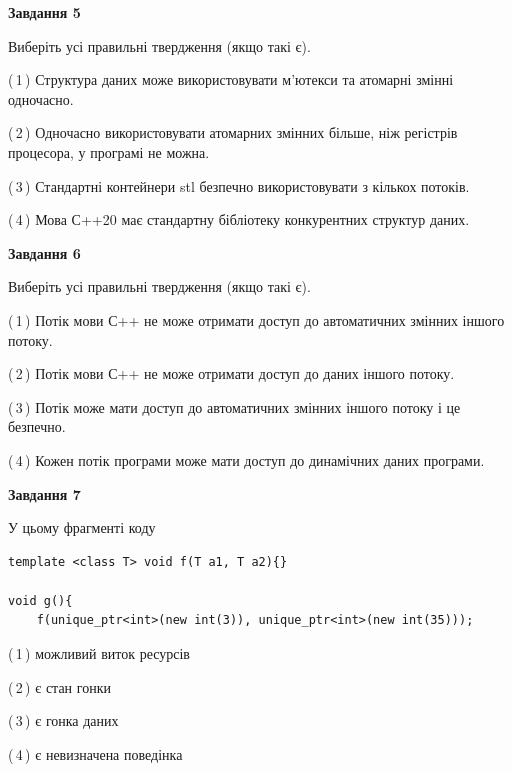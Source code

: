 \documentclass[12pt, ukrainian]{article}
\begin{document}
\begin {large}
{\begin{center}
\textbf{Завдання 5}
\end{center}

Виберіть усі правильні твердження (якщо такі є).\par
\vspace{2mm}

(\,1\,) Структура даних може використовувати м’ютекси та атомарні змінні одночасно.%

(\,2\,) Одночасно використовувати атомарних змінних більше, ніж регістрів процесора, у програмі не можна.%

(\,3\,) Стандартні контейнери stl безпечно використовувати з кількох потоків.%

(\,4\,) Мова С++20 має стандартну бібліотеку конкурентних структур даних.%
\newpage


\begin{center}
\textbf{Завдання 6}
\end{center}

Виберіть усі правильні твердження (якщо такі є).\par
\vspace{2mm}

(\,1\,) Потік мови С++ не може отримати доступ до автоматичних змінних іншого потоку.%

(\,2\,) Потік мови С++ не може отримати доступ до даних іншого потоку.%

(\,3\,) Потік може мати доступ до автоматичних змінних іншого потоку і це безпечно.%

(\,4\,) Кожен потік програми може мати доступ до динамічних даних програми.%


\begin{center}
\textbf{Завдання 7}
\end{center}

У цьому фрагменті коду
\begin{verbatim}
template <class T> void f(T a1, T a2){}

void g(){
    f(unique_ptr<int>(new int(3)), unique_ptr<int>(new int(35)));
\end{verbatim}

(\,1\,) можливий виток ресурсів%

(\,2\,) є стан гонки%

(\,3\,) є гонка даних%

(\,4\,) є невизначена поведінка%

}
\end {large}

\vspace{4mm}
\newpage
\end{document}

